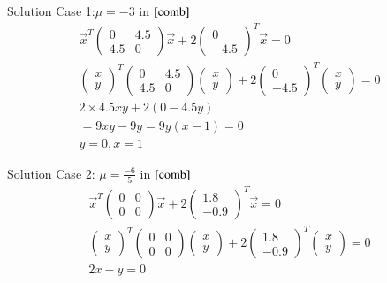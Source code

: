 \documentclass{beamer}
\begin{document}
\begin{frame}{Solution}
Case 1:$\mu=-3$ in $\eqref{comb}$
\begin{align}
    \vec{x}^T\begin{pmatrix}0&4.5\\4.5&0\end{pmatrix}\vec{x}+2\begin{pmatrix}0\\-4.5\end{pmatrix}^T\vec{x}=0\\
    \begin{pmatrix}x\\y\end{pmatrix}^T\begin{pmatrix}0&4.5\\4.5&0\end{pmatrix}\begin{pmatrix}x\\y\end{pmatrix}+2\begin{pmatrix}0\\-4.5\end{pmatrix}^T\begin{pmatrix}x\\y\end{pmatrix}=0\\
    2\times4.5xy+2(0-4.5y)\\=9xy-9y=9y(x-1)=0\\
    y=0,x=1
\end{align}
\end{frame}
\begin{frame}{Solution}
Case 2: $\mu=\frac{-6}{5}$ in $\eqref{comb}$
\begin{align}
    \vec{x}^T\begin{pmatrix}0&0\\0&0\end{pmatrix}\vec{x}+2\begin{pmatrix}1.8\\-0.9\end{pmatrix}^T\vec{x}=0\\
    \begin{pmatrix}x\\y\end{pmatrix}^T\begin{pmatrix}0&0\\0&0\end{pmatrix}\begin{pmatrix}x\\y\end{pmatrix}+2\begin{pmatrix}1.8\\-0.9\end{pmatrix}^T\begin{pmatrix}x\\y\end{pmatrix}=0\\
    2x-y=0
\end{align}
\end{frame}
\end{document}
